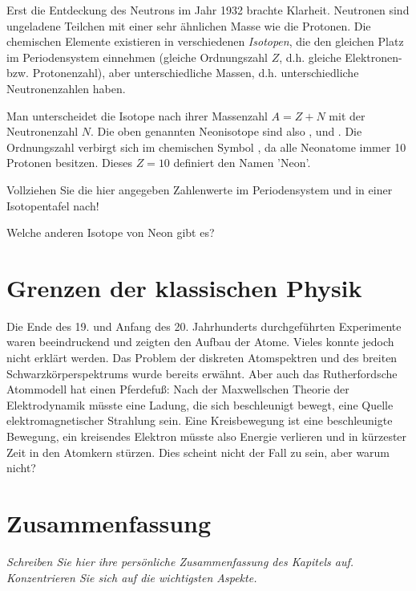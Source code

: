Erst die Entdeckung des Neutrons im Jahr 1932 brachte Klarheit. Neutronen sind ungeladene Teilchen mit einer sehr ähnlichen Masse wie die Protonen. Die chemischen Elemente existieren in verschiedenen \emph{Isotopen}, die den gleichen Platz im Periodensystem einnehmen (gleiche Ordnungszahl $Z$, d.h. gleiche Elektronen- bzw. Protonenzahl), aber unterschiedliche Massen, d.h. unterschiedliche Neutronenzahlen haben.

Man unterscheidet die Isotope nach ihrer Massenzahl $A = Z + N$ mit der Neutronenzahl $N$. Die oben genannten Neonisotope sind also ,  und . Die Ordnungszahl verbirgt sich im chemischen Symbol , da alle Neonatome immer 10 Protonen besitzen. Dieses $Z=10$ definiert den Namen 'Neon'.


\begin{questions}  
    \item Vollziehen Sie die hier angegeben Zahlenwerte im Periodensystem und in einer Isotopentafel nach! 
    \item Welche anderen Isotope von Neon gibt es?
\end{questions}

  

\section{Grenzen der klassischen Physik}

Die Ende des 19. und Anfang des 20. Jahrhunderts durchgeführten Experimente waren beeindruckend und zeigten den Aufbau der Atome. Vieles konnte jedoch nicht erklärt werden. Das Problem der diskreten Atomspektren und des breiten Schwarzkörperspektrums wurde bereits erwähnt. Aber auch das Rutherfordsche Atommodell hat einen Pferdefuß: Nach der Maxwellschen Theorie der Elektrodynamik müsste eine Ladung, die sich beschleunigt bewegt, eine Quelle elektromagnetischer Strahlung sein. Eine Kreisbewegung ist eine beschleunigte Bewegung, ein kreisendes Elektron müsste also Energie verlieren und in kürzester Zeit in den Atomkern stürzen. Dies scheint nicht der Fall zu sein, aber warum nicht?

\section{Zusammenfassung}

\textit{Schreiben Sie hier ihre persönliche Zusammenfassung des Kapitels auf. Konzentrieren Sie sich auf die wichtigsten Aspekte.}

\vspace*{10cm}




\printbibliography[segment=\therefsegment,heading=subbibliography]
